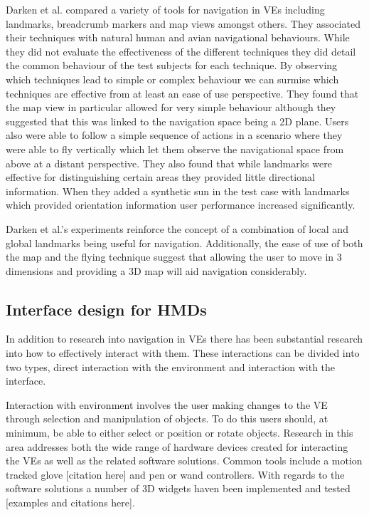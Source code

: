 \documentclass{sig-alternate-05-2015}
\begin{document}
Darken et al. compared a variety of tools for navigation in VEs including landmarks, breadcrumb markers and map views amongst others\cite{Darken1993}. They associated their techniques with natural human and avian  navigational behaviours. While they did not evaluate the effectiveness of the different techniques they did detail the common behaviour of the test subjects for each technique. By observing which techniques lead to simple or complex behaviour we can surmise which techniques are effective from at least an ease of use perspective. They found that the map view in particular allowed for very simple behaviour although they suggested that this was linked to the navigation space being a 2D plane. Users also were able to follow a simple sequence of actions in a scenario where they were able to fly vertically which let them observe the navigational space from above at a distant perspective. They also found that while landmarks were effective for distinguishing certain areas they provided little directional information. When they added a synthetic sun in the test case with landmarks which provided orientation information user performance increased significantly.

Darken et al.'s experiments reinforce the concept of a combination of local and global landmarks being useful for navigation. Additionally, the ease of use of both the map and the flying technique suggest that allowing the user to move in 3 dimensions and providing a 3D map will aid navigation considerably. 
\subsection{Interface design for HMDs}
In addition to research into navigation in VEs there has been substantial research into how to effectively interact with them. These interactions can be divided into two types, direct interaction with the environment and interaction with the interface.

 Interaction with environment involves the user making changes to the VE through selection and manipulation of objects. To do this users should, at minimum, be able to either select or position or rotate objects\cite{Bowman2001}. Research in this area addresses both the wide range of hardware devices created for interacting the VEs as well as the related software solutions. Common tools include a motion tracked glove [citation here] and pen or wand controllers. With regards to the software solutions a number of 3D widgets haven been implemented and tested [examples and citations here].
 
\end{document}
